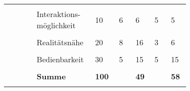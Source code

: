 \documentclass[main.tex]{subfiles} %
\begin{document}
\begin{table}[H]
\begin{tabular}{|p{0.14\linewidth}|p{0.15\linewidth}|p{0.115\linewidth}|p{0.08\linewidth}|p{0.09\linewidth}|p{0.08\linewidth}|p{0.09\linewidth}|}
        \cline{2-7}
                                                           &                                     &                                              &                                                &             &            &             \\[-9pt]
                                                           & Interaktions-möglichkeit            & 10                                           & 6                                              & 6           & 5          & 5           \\[1pt]
        \cline{2-7}
                                                           &                                     &                                              &                                                &             &            &             \\[-9pt]
                                                           & Realitätsnähe                       & 20                                           & 8                                              & 16          & 3          & 6           \\[1pt]
        \cline{2-7}
                                                           &                                     &                                              &                                                &             &            &             \\[-9pt]
                                                           & Bedienbarkeit                       & 30                                           & 5                                              & 15          & 5          & 15          \\[1pt]
        \cline{2-7}
                                                           &                                     &                                              &                                                &             &            &             \\[-9pt]
                                                           & \textbf{Summe}                      & \textbf{100}                                 &                                                & \textbf{49} &            & \textbf{58} \\[1pt]
        \hline
        \hline
                                                           & \multicolumn{2}{c|}{}               & \multicolumn{2}{c|}{}                        & \multicolumn{2}{c|}{}                                                                   \\[-9pt]

\end{tabular}
\end{table}
\end{document}
